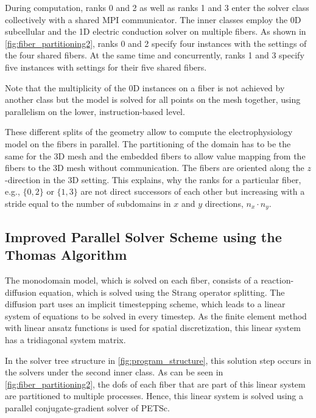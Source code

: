 During computation, ranks 0 and 2 as well as ranks 1 and 3 enter the  solver class collectively with a shared MPI communicator.
The inner  classes employ the 0D subcellular and the 1D electric conduction solver on multiple fibers. As shown in \cref{fig:fiber_partitioning2}, ranks 0 and 2 specify four instances with the settings of the four shared fibers. At the same time and concurrently, ranks 1 and 3 specify five instances with settings for their five shared fibers. 

Note that the multiplicity of the 0D instances on a fiber is not achieved by another  class but the model is solved for all points on the mesh together, using parallelism on the lower, instruction-based level.

These different splits of the geometry allow to compute the electrophysiology model on the fibers in parallel. The partitioning of the domain has to be the same for the 3D mesh and the embedded fibers to allow value mapping from the fibers to the 3D mesh without communication. The fibers are oriented along the $z$-direction in the 3D setting. This explains, why the ranks for a particular fiber, e.g., $\{0,2\}$ or $\{1,3\}$ are not direct successors of each other but increasing with a stride equal to the number of subdomains in $x$ and $y$ directions, $n_x \cdot n_y$.

\subsection{Improved Parallel Solver Scheme using the Thomas Algorithm}\label{sec:improved_parallel_solver_for_fiber_based}

The monodomain model, which is solved on each fiber, consists of a reaction-diffusion equation, which is solved using the Strang operator splitting.
The diffusion part uses an implicit timestepping scheme, which leads to a linear system of equations to be solved in every timestep.
As the finite element method with linear ansatz functions is used for spatial discretization, this linear system has a tridiagonal system matrix.

In the solver tree structure in \cref{fig:program_structure}, this solution step occurs in the solvers under the second inner  class.  As can be seen in \cref{fig:fiber_partitioning2}, the dofs of each fiber that are part of this linear system are partitioned to multiple processes. Hence, this linear system is solved using a parallel conjugate-gradient solver of PETSc.

